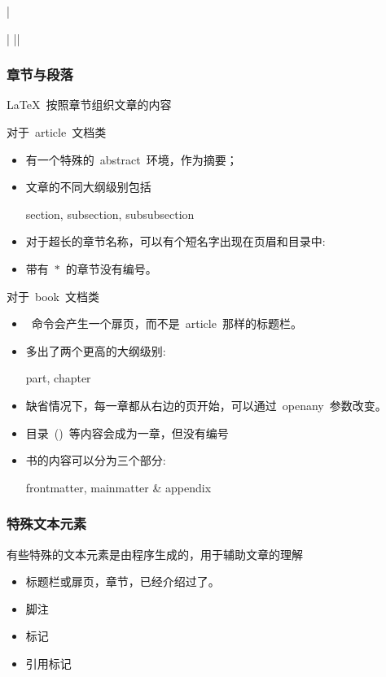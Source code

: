 \vbmkt|\maketitle|
\vbtoc|\tableofcontents|
\begin{frame}
	\frametitle{章节与段落}
	\LaTeX~按照章节组织文章的内容
	\begin{overprint}
		\begin{block}{对于~\alert{article}~文档类}
			\begin{itemize}
				\item<2-5> 有一个特殊的~\alert{abstract}~环境，作为摘要；
				\item<3-5> 文章的不同大纲级别包括

					section, subsection, subsubsection

				\item<4-5> 对于超长的章节名称，可以有个短名字出现在页眉和目录中:
					
				\item<5> 带有~$\ast$~的章节没有编号。
					
			\end{itemize}
		\end{block}
		\begin{block}{对于~\alert{book}~文档类}
			\begin{itemize}
				\item<7-11> \alert{\vbmkt}~命令会产生一个扉页，而不是~\alert{article}~那样的标题栏。
				\item<8-11> 多出了两个更高的大纲级别:

					part, chapter

				\item<9-11> 缺省情况下，每一章都从右边的页开始，可以通过~openany~参数改变。
				\item<10-11> 目录~(\vbtoc)~等内容会成为一章，但没有编号
				\item<11> 书的内容可以分为三个部分:

					frontmatter, mainmatter \& appendix
			\end{itemize}
		\end{block}
	\end{overprint}
\end{frame}

\begin{frame}
	\frametitle{特殊文本元素}
	有些特殊的文本元素是由程序生成的，用于辅助文章的理解
	\begin{itemize}
		\item<2-|alert@2> 标题栏或扉页，章节，已经介绍过了。
		\item<3-|alert@3> 脚注
			
		\item<4-|alert@4> 标记
			
		\item<5-|alert@5> 引用标记
			
	\end{itemize}
\end{frame}

